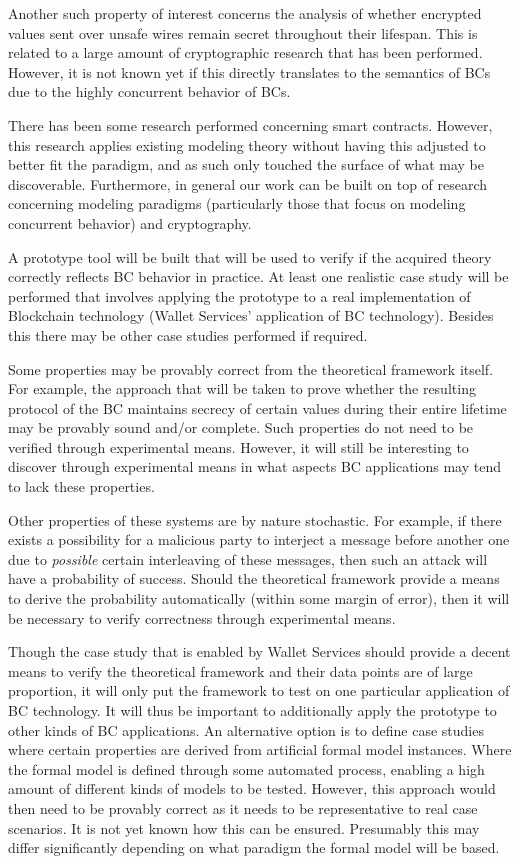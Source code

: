 \documentclass[]{article}
\begin{document}
Another such property of interest concerns the analysis of whether encrypted values sent over unsafe wires remain secret throughout their lifespan. This is related to a large amount of cryptographic research that has been performed. However, it is not known yet if this directly translates to the semantics of BCs due to the highly concurrent behavior of BCs.

There has been some research performed concerning smart contracts. However, this research applies existing modeling theory without having this adjusted to better fit the paradigm, and as such only touched the surface of what may be discoverable. Furthermore, in general our work can be built on top of research concerning modeling paradigms (particularly those that focus on modeling concurrent behavior) and cryptography.

A prototype tool will be built that will be used to verify if the acquired theory correctly reflects BC behavior in practice. At least one realistic case study will be performed that involves applying the prototype to a real implementation of Blockchain technology (Wallet Services' application of BC technology). Besides this there may be other case studies performed if required.

Some properties may be provably correct from the theoretical framework itself. For example, the approach that will be taken to prove whether the resulting protocol of the BC maintains secrecy of certain values during their entire lifetime may be provably sound and/or complete. Such properties do not need to be verified through experimental means. However, it will still be interesting to discover through experimental means in what aspects BC applications may tend to lack these properties.

Other properties of these systems are by nature stochastic. For example, if there exists a possibility for a malicious party to interject a message before another one due to \emph{possible} certain interleaving of these messages, then such an attack will have a probability of success. Should the theoretical framework provide a means to derive the probability automatically (within some margin of error), then it will be necessary to verify correctness through experimental means.

Though the case study that is enabled by Wallet Services should provide a decent means to verify the theoretical framework and their data points are of large proportion, it will only put the framework to test on one particular application of BC technology. It will thus be important to additionally apply the prototype to other kinds of BC applications. An alternative option is to define case studies where certain properties are derived from artificial formal model instances. Where the formal model is defined through some automated process, enabling a high amount of different kinds of models to be tested. However, this approach would then need to be provably correct as it needs to be representative to real case scenarios. It is not yet known how this can be ensured. Presumably this may differ significantly depending on what paradigm the formal model will be based.
\end{document}

